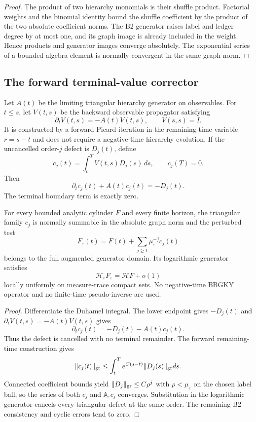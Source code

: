 \begin{proof}
The product of two hierarchy monomials is their shuffle product.  Factorial
weights and the binomial identity bound the shuffle coefficient by the product
of the two absolute coefficient norms.  The B2 generator raises label and
ledger degree by at most one, and its graph image is already included in the
weight.  Hence products and generator images converge absolutely.  The
exponential series of a bounded algebra element is normally convergent in the
same graph norm.
\end{proof}

\subsection{The forward terminal-value corrector}

Let $A(t)$ be the limiting triangular hierarchy generator on observables.
For $t\le s$, let $V(t,s)$ be the backward observable propagator satisfying
\[
 \partial_tV(t,s)=-A(t)V(t,s),
 \qquad V(s,s)=I.
\]
It is constructed by a forward Picard iteration in the remaining-time variable
$r=s-t$ and does not require a negative-time hierarchy evolution.  If the
uncancelled order-$j$ defect is $D_j(t)$, define
\[
 c_j(t)=\int_t^T V(t,s)D_j(s)\,ds,
 \qquad c_j(T)=0.
\]
Then
\[
 \partial_t c_j(t)+A(t)c_j(t)=-D_j(t).
\]
The terminal boundary term is exactly zero.

\begin{theorem}
\label{thm:r7-b4-corrector}
For every bounded analytic cylinder $F$ and every finite horizon, the
triangular family $c_j$ is normally summable in the absolute graph norm and the
perturbed test
\[
 F_\varepsilon(t)=F(t)+\sum_{j\ge1}\mu_\varepsilon^{-j}c_j(t)
\]
belongs to the full augmented generator domain.  Its logarithmic generator
satisfies
\[
 \mathcal H_\varepsilon F_\varepsilon
 =\mathcal H F+o(1)
\]
locally uniformly on measure-trace compact sets.  No negative-time BBGKY
operator and no finite-time pseudo-inverse are used.
\end{theorem}

\begin{proof}
Differentiate the Duhamel integral.  The lower endpoint gives
$-D_j(t)$ and $\partial_tV(t,s)=-A(t)V(t,s)$ gives
\[
 \partial_tc_j(t)=-D_j(t)-A(t)c_j(t).
\]
Thus the defect is cancelled with no terminal remainder.  The forward
remaining-time construction gives
\[
 \|c_j(t)\|_{\rm gr}
 \le\int_t^Te^{C(s-t)}\|D_j(s)\|_{\rm gr}ds.
\]
Connected coefficient bounds yield
$\|D_j\|_{\rm gr}\le C\rho^j$ with $\rho<\mu_\varepsilon$ on the chosen label
ball, so the series of both $c_j$ and $\mathbb A_\varepsilon c_j$ converges.
Substitution in the logarithmic generator cancels every triangular defect at
the same order.  The remaining B2 consistency and cyclic errors tend to zero.
\end{proof}

